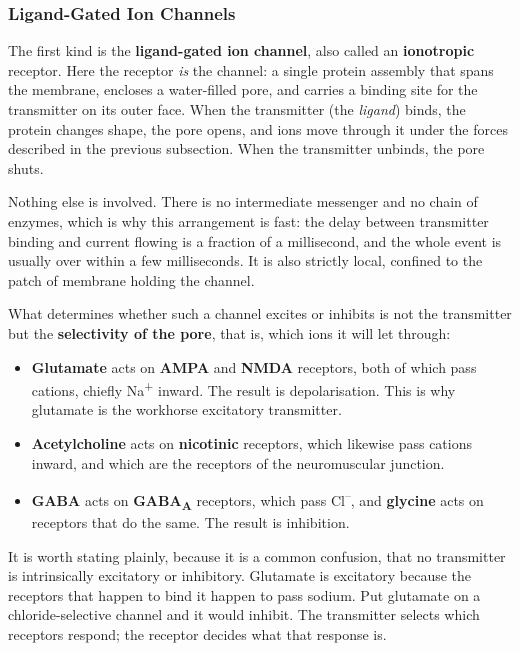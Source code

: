 \documentclass[11pt]{article}
\begin{document}
\subsubsection{Ligand-Gated Ion Channels}

The first kind is the \textbf{ligand-gated ion channel}, also called an \textbf{ionotropic} receptor. Here the receptor \textit{is} the channel: a single protein assembly that spans the membrane, encloses a water-filled pore, and carries a binding site for the transmitter on its outer face. When the transmitter (the \textit{ligand}) binds, the protein changes shape, the pore opens, and ions move through it under the forces described in the previous subsection. When the transmitter unbinds, the pore shuts.

Nothing else is involved. There is no intermediate messenger and no chain of enzymes, which is why this arrangement is fast: the delay between transmitter binding and current flowing is a fraction of a millisecond, and the whole event is usually over within a few milliseconds. It is also strictly local, confined to the patch of membrane holding the channel.

What determines whether such a channel excites or inhibits is not the transmitter but the \textbf{selectivity of the pore}, that is, which ions it will let through:

\begin{itemize}
    \item \textbf{Glutamate} acts on \textbf{AMPA} and \textbf{NMDA} receptors, both of which pass cations, chiefly Na\textsuperscript{+} inward. The result is depolarisation. This is why glutamate is the workhorse excitatory transmitter.
    \item \textbf{Acetylcholine} acts on \textbf{nicotinic} receptors, which likewise pass cations inward, and which are the receptors of the neuromuscular junction.
    \item \textbf{GABA} acts on \textbf{GABA\textsubscript{A}} receptors, which pass Cl\textsuperscript{--}, and \textbf{glycine} acts on receptors that do the same. The result is inhibition.
\end{itemize}

It is worth stating plainly, because it is a common confusion, that no transmitter is intrinsically excitatory or inhibitory. Glutamate is excitatory because the receptors that happen to bind it happen to pass sodium. Put glutamate on a chloride-selective channel and it would inhibit. The transmitter selects which receptors respond; the receptor decides what that response is.
\end{document}
